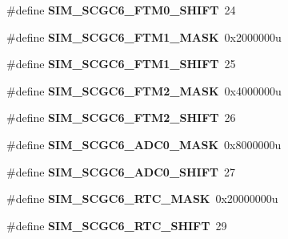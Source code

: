 \begin{DoxyCompactItemize}
\item 
\#define {\bfseries S\+I\+M\+\_\+\+S\+C\+G\+C6\+\_\+\+F\+T\+M0\+\_\+\+S\+H\+I\+FT}~24\hypertarget{group__SIM__Register__Masks_ga7d1645004ea28638d3370def2505aad0}{}\label{group__SIM__Register__Masks_ga7d1645004ea28638d3370def2505aad0}

\item 
\#define {\bfseries S\+I\+M\+\_\+\+S\+C\+G\+C6\+\_\+\+F\+T\+M1\+\_\+\+M\+A\+SK}~0x2000000u\hypertarget{group__SIM__Register__Masks_gacd8912282b78e6b939981ce4c313065f}{}\label{group__SIM__Register__Masks_gacd8912282b78e6b939981ce4c313065f}

\item 
\#define {\bfseries S\+I\+M\+\_\+\+S\+C\+G\+C6\+\_\+\+F\+T\+M1\+\_\+\+S\+H\+I\+FT}~25\hypertarget{group__SIM__Register__Masks_gaabc95256d64e237982e5b6d15ad53e89}{}\label{group__SIM__Register__Masks_gaabc95256d64e237982e5b6d15ad53e89}

\item 
\#define {\bfseries S\+I\+M\+\_\+\+S\+C\+G\+C6\+\_\+\+F\+T\+M2\+\_\+\+M\+A\+SK}~0x4000000u\hypertarget{group__SIM__Register__Masks_ga2113e9cf896870ed64d5e834e030328b}{}\label{group__SIM__Register__Masks_ga2113e9cf896870ed64d5e834e030328b}

\item 
\#define {\bfseries S\+I\+M\+\_\+\+S\+C\+G\+C6\+\_\+\+F\+T\+M2\+\_\+\+S\+H\+I\+FT}~26\hypertarget{group__SIM__Register__Masks_ga41f5057add5cbd83e8a1c29fd33daa64}{}\label{group__SIM__Register__Masks_ga41f5057add5cbd83e8a1c29fd33daa64}

\item 
\#define {\bfseries S\+I\+M\+\_\+\+S\+C\+G\+C6\+\_\+\+A\+D\+C0\+\_\+\+M\+A\+SK}~0x8000000u\hypertarget{group__SIM__Register__Masks_ga481c725e02da6a245c9d715307969f09}{}\label{group__SIM__Register__Masks_ga481c725e02da6a245c9d715307969f09}

\item 
\#define {\bfseries S\+I\+M\+\_\+\+S\+C\+G\+C6\+\_\+\+A\+D\+C0\+\_\+\+S\+H\+I\+FT}~27\hypertarget{group__SIM__Register__Masks_ga3f62de5fc5ccaa13d6975cf1e0ebba03}{}\label{group__SIM__Register__Masks_ga3f62de5fc5ccaa13d6975cf1e0ebba03}

\item 
\#define {\bfseries S\+I\+M\+\_\+\+S\+C\+G\+C6\+\_\+\+R\+T\+C\+\_\+\+M\+A\+SK}~0x20000000u\hypertarget{group__SIM__Register__Masks_gad51b16006c9f793c4b342ea1ff91a846}{}\label{group__SIM__Register__Masks_gad51b16006c9f793c4b342ea1ff91a846}

\item 
\#define {\bfseries S\+I\+M\+\_\+\+S\+C\+G\+C6\+\_\+\+R\+T\+C\+\_\+\+S\+H\+I\+FT}~29\hypertarget{group__SIM__Register__Masks_gac04e5a3a7a2848658a30e7c89f791f39}{}\label{group__SIM__Register__Masks_gac04e5a3a7a2848658a30e7c89f791f39}


\end{DoxyCompactItemize}
